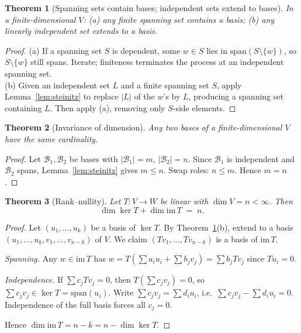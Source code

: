 \documentclass[11pt]{article}
\newtheorem{theorem}{Theorem}[section]
\theoremstyle{remark}
\begin{document}
\begin{theorem}[Spanning sets contain bases; independent sets extend to bases]\label{thm:basis-ext}
In a finite-dimensional $V$: (a) any finite spanning set contains a basis; (b) any linearly independent set extends to a basis.
\end{theorem}

\begin{proof}
(a) If a spanning set $S$ is dependent, some $w\in S$ lies in $\mathrm{span}(S\setminus\{w\})$, so $S\setminus\{w\}$ still spans. Iterate; finiteness terminates the process at an independent spanning set.\\
(b) Given an independent set $L$ and a finite spanning set $S$, apply Lemma~\ref{lem:steinitz} to replace $|L|$ of the $w$'s by $L$, producing a spanning set containing $L$. Then apply (a), removing only $S$-side elements.
\end{proof}

\begin{theorem}[Invariance of dimension]\label{thm:dim}
Any two bases of a finite-dimensional $V$ have the same cardinality.
\end{theorem}

\begin{proof}
Let $\mathcal{B}_1,\mathcal{B}_2$ be bases with $|\mathcal{B}_1|=m$, $|\mathcal{B}_2|=n$. Since $\mathcal{B}_1$ is independent and $\mathcal{B}_2$ spans, Lemma~\ref{lem:steinitz} gives $m\le n$. Swap roles: $n\le m$. Hence $m=n$.
\end{proof}

\begin{theorem}[Rank--nullity]\label{thm:ranknul}
Let $T\colon V\to W$ be linear with $\dim V = n < \infty$. Then
\[
\dim \ker T + \dim \mathrm{im}\,T \;=\; n.
\]
\end{theorem}

\begin{proof}
Let $(u_1,\dots,u_k)$ be a basis of $\ker T$. By Theorem~\ref{thm:basis-ext}(b), extend to a basis $(u_1,\dots,u_k,v_1,\dots,v_{n-k})$ of $V$. We claim $(Tv_1,\dots,Tv_{n-k})$ is a basis of $\mathrm{im}\,T$.

\emph{Spanning.} Any $w\in\mathrm{im}\,T$ has $w = T(\sum a_i u_i + \sum b_j v_j) = \sum b_j Tv_j$ since $Tu_i = 0$.

\emph{Independence.} If $\sum c_j Tv_j = 0$, then $T(\sum c_j v_j) = 0$, so $\sum c_j v_j \in \ker T = \mathrm{span}(u_i)$. Write $\sum c_j v_j = \sum d_i u_i$, i.e.\ $\sum c_j v_j - \sum d_i u_i = 0$. Independence of the full basis forces all $c_j = 0$.

Hence $\dim \mathrm{im}\,T = n-k = n - \dim \ker T$.
\end{proof}
\end{document}
